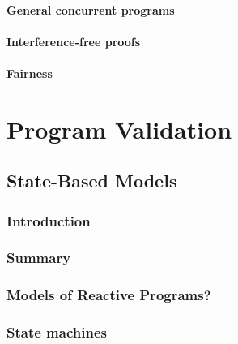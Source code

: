 \documentclass[12pt, a4paper]{book}
\begin{document}
  \subsubsection{General concurrent programs}
  \label{subs:General concurrent programs}
  \subsubsection{Interference-free proofs}
  \label{subs:Interference-free proofs}
  \subsubsection{Fairness}
  \label{subs:Fairness}



  \chapter{Program Validation}
  \label{chap:Program Validation}

  \section{State-Based Models}
  \label{sec:State-Based Models}
  \subsection{Introduction}
  \label{sub:Introduction}
  \subsection{Summary}
  \label{sub:Summary}
  \subsection{Models of Reactive Programs?}
  \label{sub:Models of Reactive Programs?}
  \subsection{State machines}
  \label{sub:State machines}
\end{document}
